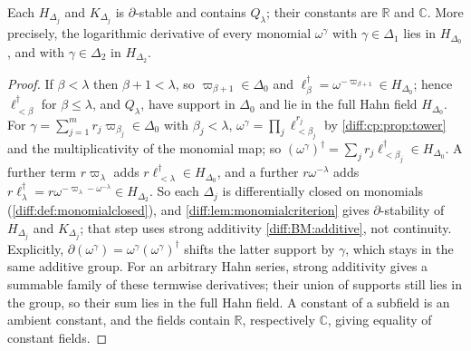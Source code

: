 \documentclass[11pt,letterpaper]{article}
\numberwithin{equation}{section}
\theoremstyle{definition}
\theoremstyle{remark}
\newcommand{\R}{\mathbb R}
\newcommand{\C}{\mathbb C}
\newcommand{\der}{\partial}
\begin{document}
\begin{proposition}
\label{diff:cp:prop:fieldclosure}
Each $H_{\Delta_{j}}$ and $K_{\Delta_{j}}$ is $\der$-stable and contains
$Q_{\lambda}$; their constants are $\R$ and $\C$. More precisely, the
logarithmic derivative of every monomial $\omega^{\gamma}$ with
$\gamma\in\Delta_{1}$ lies in $H_{\Delta_{0}}$, and with $\gamma\in\Delta_{2}$ in
$H_{\Delta_{2}}$.
\end{proposition}
\begin{proof}
If $\beta<\lambda$ then $\beta+1<\lambda$, so $\varpi_{\beta+1}\in\Delta_{0}$
and $\ell_{\beta}^{\dagger}=\omega^{-\varpi_{\beta+1}}\in H_{\Delta_{0}}$; hence
$\ell_{<\beta}^{\dagger}$ for $\beta\leq\lambda$, and $Q_{\lambda}$, have support
in $\Delta_{0}$ and lie in the full Hahn field $H_{\Delta_{0}}$. For
$\gamma=\sum_{j=1}^{m}r_{j}\varpi_{\beta_{j}}\in\Delta_{0}$ with $\beta_{j}<\lambda$,
$\omega^{\gamma}=\prod_{j}\ell_{<\beta_{j}}^{r_{j}}$ by \cref{diff:cp:prop:tower}
and the multiplicativity of the monomial map; so
$(\omega^{\gamma})^{\dagger}=\sum_{j}r_{j}\ell_{<\beta_{j}}^{\dagger}\in H_{\Delta_{0}}$.
A further term $r\varpi_{\lambda}$ adds $r\ell_{<\lambda}^{\dagger}\in
H_{\Delta_{0}}$, and a further $r\omega^{-\lambda}$ adds
$r\ell_{\lambda}^{\dagger}=r\omega^{-\varpi_{\lambda}-\omega^{-\lambda}}\in
H_{\Delta_{2}}$. So each $\Delta_{j}$ is differentially closed on monomials
(\cref{diff:def:monomialclosed}), and \cref{diff:lem:monomialcriterion} gives
$\der$-stability of $H_{\Delta_{j}}$ and $K_{\Delta_{j}}$; that step uses
strong additivity \ref{diff:BM:additive}, not continuity.
Explicitly, $\der(\omega^\gamma)=\omega^\gamma
(\omega^\gamma)^\dagger$ shifts the latter support by $\gamma$,
which stays in the same additive group. For an arbitrary Hahn
series, strong additivity gives a summable family of these
termwise derivatives; their union of supports still lies in the
group, so their sum lies in the full Hahn field. A constant of a
subfield is an ambient constant, and the fields contain $\R$,
respectively $\C$, giving equality of constant fields.
\end{proof}
\end{document}
